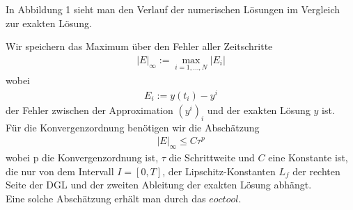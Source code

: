 \documentclass[11pt,a4paper]{article}
\begin{document}
In Abbildung 1 sieht man den Verlauf der numerischen L\"osungen im Vergleich zur exakten L\"osung.

Wir speichern das Maximum \"uber den Fehler aller Zeitschritte
\begin{align*}
|E|_{\infty}:=\max_{i=1,...,N}|E_i|
\end{align*}
wobei
\begin{align*}
E_i:=y(t_i)-y^i
\end{align*}
der Fehler zwischen der Approximation $(y^i)_i$ und der exakten L\"osung $y$ ist.\\


F\"ur die Konvergenzordnung ben\"otigen wir die Absch\"atzung
\begin{align*}
|E|_{\infty}{\leq} C{\tau}^p
\end{align*}
wobei p die Konvergenzordnung ist, $\tau$ die Schrittweite und $C$ eine Konstante ist, die nur von dem Intervall $I = [0,T]$, der Lipschitz-Konstanten $L_f$ der rechten Seite der DGL und der zweiten Ableitung der exakten L\"osung abh\"angt.\\

Eine solche Absch\"atzung erh\"alt man durch das $eoctool$.
  
\end{document}
